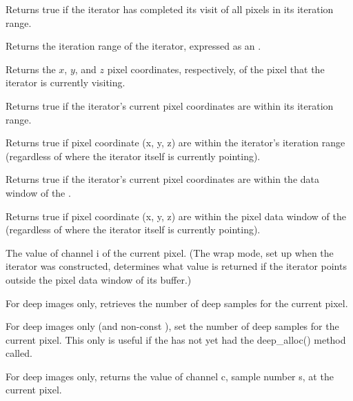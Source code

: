Returns {\cf true} if the iterator has completed its visit of all pixels
in its iteration range.
\apiend

Returns the iteration range of the iterator, expressed as an \ROI.
\apiend

Returns the $x$, $y$, and $z$ pixel coordinates, respectively, of the
pixel that the iterator is currently visiting.
\apiend

Returns {\cf true} if the iterator's current pixel coordinates 
are within its iteration range.
\apiend

Returns {\cf true} if pixel coordinate ({\cf x, y, z}) are within the
iterator's iteration range (regardless of where the iterator itself
is currently pointing).
\apiend

Returns {\cf true} if the iterator's current pixel coordinates 
are within the data window of the \ImageBuf.
\apiend

Returns {\cf true} if pixel coordinate ({\cf x, y, z}) are within the
pixel data window of the \ImageBuf (regardless of where the iterator itself
is currently pointing).
\apiend

The value of channel {\cf i} of the current pixel.  (The wrap
mode, set up when the iterator was constructed, determines what value
is returned if the iterator points outside the pixel data window of
its buffer.)
\apiend

For deep images only, retrieves the number of deep samples for the
current pixel.
\apiend

For deep images only (and non-const \ImageBuf), set the number of deep
samples for the current pixel. This only is useful if the \ImageBuf has
not yet had the {\cf deep_alloc()} method called.
\apiend

For deep images only, returns the value of channel {\cf c}, sample
number {\cf s}, at the current pixel.
\apiend

